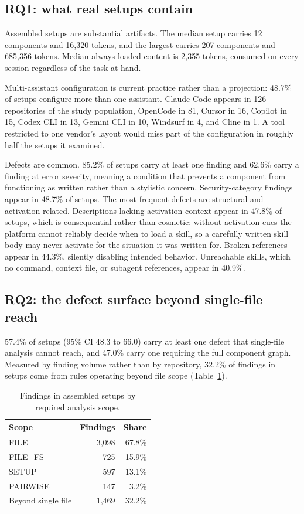 \documentclass[conference]{IEEEtran}
\begin{document}
\subsection{RQ1: what real setups contain}

Assembled setups are substantial artifacts. The median setup carries 12
components and 16{,}320 tokens, and the largest carries 207 components and
685{,}356 tokens. Median always-loaded content is 2{,}355 tokens, consumed on
every session regardless of the task at hand.

Multi-assistant configuration is current practice rather than a projection:
48.7\% of setups configure more than one assistant. Claude Code appears in 126
repositories of the study population, OpenCode in 81, Cursor in 16, Copilot in
15, Codex CLI in 13, Gemini CLI in 10, Windsurf in 4, and Cline in 1. A tool
restricted to one vendor's layout would miss part of the configuration in
roughly half the setups it examined.

Defects are common. 85.2\% of setups carry at least one finding and 62.6\% carry
a finding at error severity, meaning a condition that prevents a component from
functioning as written rather than a stylistic concern. Security-category
findings appear in 48.7\% of setups. The most frequent defects are structural
and activation-related. Descriptions lacking activation context appear in 47.8\%
of setups, which is consequential rather than cosmetic: without activation cues
the platform cannot reliably decide when to load a skill, so a carefully written
skill body may never activate for the situation it was written for. Broken
references appear in 44.3\%, silently disabling intended behavior. Unreachable
skills, which no command, context file, or subagent references, appear in 40.9\%.

\subsection{RQ2: the defect surface beyond single-file reach}
\label{sec:rq2}

57.4\% of setups (95\% CI 48.3 to 66.0) carry at least one defect that
single-file analysis cannot reach, and 47.0\% carry one requiring the full
component graph. Measured by finding volume rather than by repository, 32.2\% of
findings in setups come from rules operating beyond file scope
(Table~\ref{tab:ablation}).

\begin{table}[t]
\caption{Findings in assembled setups by required analysis scope.}
\label{tab:ablation}
\centering
\small
\begin{tabular}{lrr}
\toprule
Scope & Findings & Share \\
\midrule
FILE      & 3{,}098 & 67.8\% \\
FILE\_FS  &    725 & 15.9\% \\
SETUP     &    597 & 13.1\% \\
PAIRWISE  &    147 &  3.2\% \\
\midrule
Beyond single file & 1{,}469 & 32.2\% \\
\bottomrule
\end{tabular}
\end{table}
\end{document}
